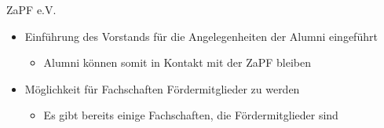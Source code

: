 \documentclass[compress, aspectratio=169]{beamer}
\begin{document}
                      
\begin{frame}{ZaPF e.V.}                        
     \begin{itemize}                          
     \item Einführung des Vorstands für die Angelegenheiten der Alumni eingeführt                       
      \begin{itemize}
      \item Alumni können somit in Kontakt mit der ZaPF bleiben
      \end{itemize}
      \item Möglichkeit für Fachschaften Fördermitglieder zu werden
      \begin{itemize}
      \item Es gibt bereits einige Fachschaften, die Fördermitglieder sind
      \end{itemize}
      \end{itemize}
\end{frame}            
\end{document}
